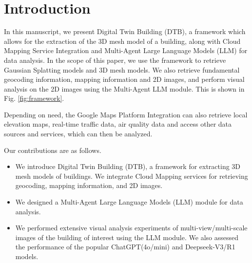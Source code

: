 \section{Introduction}

In this manuscript, we present Digital Twin Building (DTB), a framework which allows for the extraction of the 3D mesh model of a building, along with Cloud Mapping Service Integration and Multi-Agent Large Language Models (LLM) for data analysis. In the scope of this paper, we use the framework to retrieve Gaussian Splatting models and 3D mesh models. We also retrieve fundamental geocoding information, mapping information and 2D images, and perform visual analysis on the 2D images using the Multi-Agent LLM module. This is shown in Fig. \ref{fig:framework}.

Depending on need, the Google Maps Platform Integration can also retrieve local elevation maps, real-time traffic data, air quality data and access other data sources and services, which can then be analyzed. 

Our contributions are as follows.
\begin{itemize}
    \item We introduce Digital Twin Building (DTB), a framework for extracting 3D mesh models of buildings. We integrate Cloud Mapping services for retrieving geocoding, mapping information, and 2D images.
    \item We designed a Multi-Agent Large Language Models (LLM) module for data analysis.
    \item We performed extensive visual analysis experiments of multi-view/multi-scale images of the building of interest using the LLM module. We also assessed the performance of the popular ChatGPT(4o/mini) and Deepseek-V3/R1 models.
\end{itemize}


